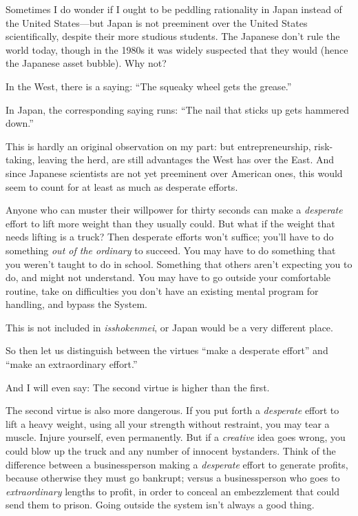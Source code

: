 {
 Sometimes I do wonder if I ought to be peddling rationality in
Japan instead of the United States---but Japan is not preeminent over
the United States scientifically, despite their more studious students.
The Japanese don't rule the world today, though in the
1980s it was widely suspected that they would (hence the Japanese asset
bubble). Why not?}

{
 In the West, there is a saying: ``The squeaky
wheel gets the grease.''}

{
 In Japan, the corresponding saying runs: ``The
nail that sticks up gets hammered down.''}

{
 This is hardly an original observation on my part: but
entrepreneurship, risk-taking, leaving the herd, are still advantages
the West has over the East. And since Japanese scientists are not yet
preeminent over American ones, this would seem to count for at least as
much as desperate efforts.}

{
 Anyone who can muster their willpower for thirty seconds can make
a \textit{desperate} effort to lift more weight than they usually
could. But what if the weight that needs lifting is a truck? Then
desperate efforts won't suffice; you'll
have to do something \textit{out of the ordinary} to succeed. You may
have to do something that you weren't taught to do in
school. Something that others aren't expecting you to
do, and might not understand. You may have to go outside your
comfortable routine, take on difficulties you don't
have an existing mental program for handling, and bypass the System.}

{
 This is not included in \textit{isshokenmei}, or Japan would be a
very different place.}

{
 So then let us distinguish between the virtues
``make a desperate effort'' and
``make an extraordinary effort.''}

{
 And I will even say: The second virtue is higher than the first.}

{
 The second virtue is also more dangerous. If you put forth a
\textit{desperate} effort to lift a heavy weight, using all your
strength without restraint, you may tear a muscle. Injure yourself,
even permanently. But if a \textit{creative} idea goes wrong, you could
blow up the truck and any number of innocent bystanders. Think of the
difference between a businessperson making a \textit{desperate} effort
to generate profits, because otherwise they must go bankrupt; versus a
businessperson who goes to \textit{extraordinary} lengths to profit, in
order to conceal an embezzlement that could send them to prison. Going
outside the system isn't always a good thing.}

